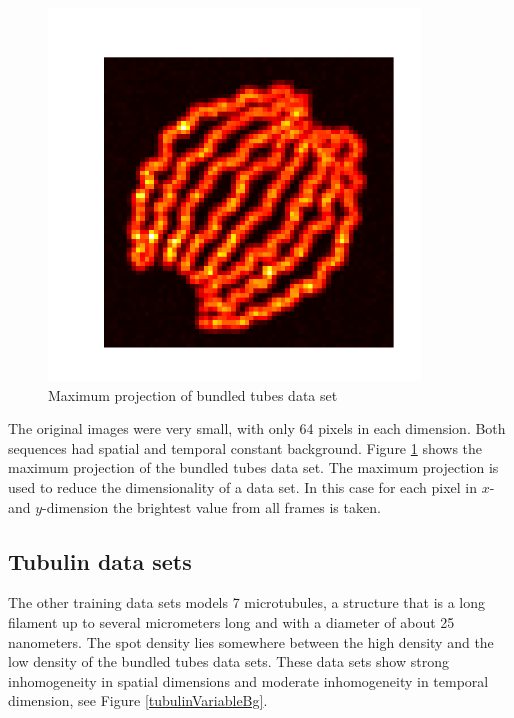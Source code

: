 \begin{figure}
\begin{minipage}[t]{0.33\textwidth}
\includegraphics[width = 0.88\textwidth]{pictures/maximumProjectionBundledTubesLSFarbig.png}
	\caption{Maximum projection of bundled tubes data set}
	\label{pctMaximumProjBundledTubes}

\end{minipage}
\end{figure}
The original images were very small, with only 64 pixels in each dimension. Both sequences had spatial and temporal constant background. Figure \ref{pctMaximumProjBundledTubes} shows the maximum projection of the bundled tubes data set. The maximum projection is used to reduce the dimensionality of a data set. In this case for each pixel in $x$- and $y$-dimension the brightest value from all frames is taken. 


\subsection{Tubulin data sets}
The other training data sets models 7 microtubules, a structure that is a long filament up to several micrometers long and with a diameter of about 25 nanometers. The spot density lies somewhere between the high density and the low density of the bundled tubes data sets. These data sets show strong inhomogeneity in spatial dimensions and moderate inhomogeneity in temporal dimension, see Figure \ref{tubulinVariableBg}.

